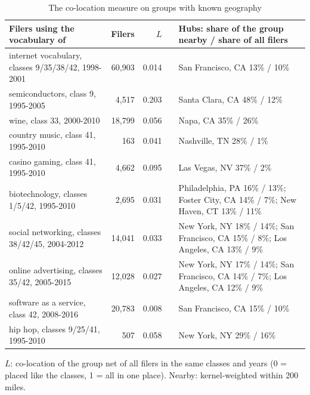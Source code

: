 \begin{table}[htbp]\centering\small
\caption{The co-location measure on groups with known geography}\label{tab:geo}
\begin{tabular}{>{\raggedright\arraybackslash}p{4.8cm}rrr>{\raggedright\arraybackslash}p{5.4cm}}
\toprule Filers using the vocabulary of & Filers & $L$ & & Hubs: share of the group nearby / share of all filers \\ \midrule
internet vocabulary, classes 9/35/38/42, 1998-2001 & 60,903 & 0.014 & & San Francisco, CA 13\% / 10\% \\
semiconductors, class 9, 1995-2005 & 4,517 & 0.203 & & Santa Clara, CA 48\% / 12\% \\
wine, class 33, 2000-2010 & 18,799 & 0.056 & & Napa, CA 35\% / 26\% \\
country music, class 41, 1995-2010 & 163 & 0.041 & & Nashville, TN 28\% / 1\% \\
casino gaming, class 41, 1995-2010 & 4,662 & 0.095 & & Las Vegas, NV 37\% / 2\% \\
biotechnology, classes 1/5/42, 1995-2010 & 2,695 & 0.031 & & Philadelphia, PA 16\% / 13\%; Foster City, CA 14\% / 7\%; New Haven, CT 13\% / 11\% \\
social networking, classes 38/42/45, 2004-2012 & 14,041 & 0.033 & & New York, NY 18\% / 14\%; San Francisco, CA 15\% / 8\%; Los Angeles, CA 13\% / 9\% \\
online advertising, classes 35/42, 2005-2015 & 12,028 & 0.027 & & New York, NY 17\% / 14\%; San Francisco, CA 14\% / 7\%; Los Angeles, CA 12\% / 9\% \\
software as a service, class 42, 2008-2016 & 20,783 & 0.008 & & San Francisco, CA 15\% / 10\% \\
hip hop, classes 9/25/41, 1995-2010 & 507 & 0.058 & & New York, NY 29\% / 16\% \\
\bottomrule\end{tabular}
\par\footnotesize $L$: co-location of the group net of all filers in the same classes and years (0 = placed like the classes, 1 = all in one place). Nearby: kernel-weighted within 200 miles.
\end{table}
